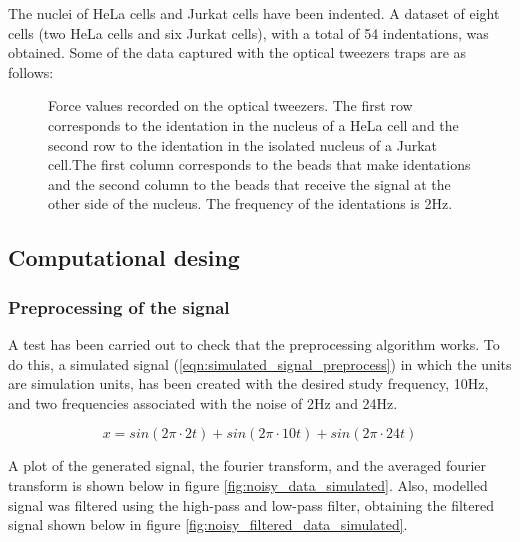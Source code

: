 \documentclass[12pt, a4paper]{article} %
\begin{document}
The nuclei of HeLa cells and Jurkat cells have been indented. A dataset of eight cells (two HeLa cells and six Jurkat cells), with a total of 54 indentations, was obtained. Some of the data captured with the optical tweezers traps are as follows:

\setlength{\parskip}{4mm}

\begin{figure}[htbp]
	\centering
	
	\caption{Force values recorded on the optical tweezers. The first row corresponds to the identation in the nucleus of a HeLa cell and the second row to the identation in the isolated nucleus of a Jurkat cell.The first column corresponds to the beads that make identations and the second column to the beads that receive the signal at the other side of the nucleus. The frequency of the identations is 2Hz.}
	\label{fig:raw_data_cells}
\end{figure}

\setlength{\parskip}{0mm}

\subsection{Computational desing}

\subsubsection{Preprocessing of the signal}

A test has been carried out to check that the preprocessing algorithm works. To do this, a simulated signal (\ref{eqn:simulated_signal_preprocess}) in which the units are simulation units, has been created with the desired study frequency, 10Hz, and two frequencies associated with the noise of 2Hz and 24Hz. 

\setlength{\parskip}{4mm}

\begin{equation} \label{eqn:simulated_signal_preprocess}
	x = sin(2\pi\cdot 2t) + sin(2\pi\cdot 10t) + sin(2\pi\cdot 24t)
\end{equation}

A plot of the generated signal, the fourier transform, and the averaged fourier transform is shown below in figure \ref{fig:noisy_data_simulated}. Also, modelled signal was filtered using the high-pass and low-pass filter, obtaining the filtered signal shown below in figure \ref{fig:noisy_filtered_data_simulated}.
\end{document}
